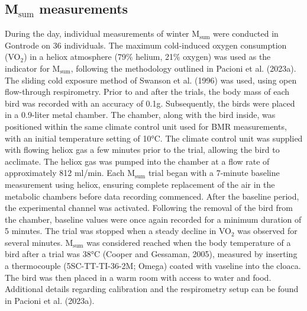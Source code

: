 \documentclass[10pt, twoside]{book} %
\begin{document}
\subsection{M$_{\text{sum}}$ measurements}

During the day, individual measurements of winter M$_{\text{sum}}$ were conducted in Gontrode on 36 individuals. The maximum cold-induced oxygen consumption (VO$_{\text{2}}$) in a heliox atmosphere (79\% helium, 21\% oxygen) was used as the indicator for M$_{\text{sum}}$, following the methodology outlined in Pacioni et al. (2023a). The sliding cold exposure method of Swanson et al. (1996) was used, using open flow-through respirometry. Prior to and after the trials, the body mass of each bird was recorded with an accuracy of 0.1g. Subsequently, the birds were placed in a 0.9-liter metal chamber. The chamber, along with the bird inside, was positioned within the same climate control unit used for BMR measurements, with an initial temperature setting of 10°C. The climate control unit was supplied with flowing heliox gas a few minutes prior to the trial, allowing the bird to acclimate. The heliox gas was pumped into the chamber at a flow rate of approximately 812 ml/min. Each M$_{\text{sum}}$ trial began with a 7-minute baseline measurement using heliox, ensuring complete replacement of the air in the metabolic chambers before data recording commenced. After the baseline period, the experimental channel was activated. Following the removal of the bird from the chamber, baseline values were once again recorded for a minimum duration of 5 minutes. The trial was stopped when a steady decline in VO$_{\text{2}}$ was observed for several minutes. M$_{\text{sum}}$ was considered reached when the body temperature of a bird after a trial was 38°C (Cooper and Gessaman, 2005), measured by inserting a thermocouple (5SC-TT-TI-36-2M; Omega) coated with vaseline into the cloaca. The bird was then placed in a warm room with access to water and food. Additional details regarding calibration and the respirometry setup can be found in Pacioni et al. (2023a).\\
\end{document}
